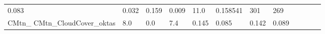 \documentclass[11pt]{article}
\begin{document}
\begin{longtable}[]{@{}llllllllllll@{}}
\begin{minipage}[t]{0.04\columnwidth}
0.083\strut
\end{minipage} & \begin{minipage}[t]{0.05\columnwidth}\raggedright\strut
0.032\strut
\end{minipage} & \begin{minipage}[t]{0.04\columnwidth}\raggedright\strut
0.159\strut
\end{minipage} & \begin{minipage}[t]{0.04\columnwidth}\raggedright\strut
0.009\strut
\end{minipage} & \begin{minipage}[t]{0.05\columnwidth}\raggedright\strut
11.0\strut
\end{minipage} & \begin{minipage}[t]{0.05\columnwidth}\raggedright\strut
0.158541\strut
\end{minipage} & \begin{minipage}[t]{0.05\columnwidth}\raggedright\strut
301\strut
\end{minipage} & \begin{minipage}[t]{0.07\columnwidth}\raggedright\strut
269\strut
\end{minipage}\tabularnewline
\begin{minipage}[t]{0.18\columnwidth}\raggedright\strut
CMtn\_ CMtn\_CloudCover\_oktas\strut
\end{minipage} & \begin{minipage}[t]{0.04\columnwidth}\raggedright\strut
8.0\strut
\end{minipage} & \begin{minipage}[t]{0.04\columnwidth}\raggedright\strut
0.0\strut
\end{minipage} & \begin{minipage}[t]{0.04\columnwidth}\raggedright\strut
7.4\strut
\end{minipage} & \begin{minipage}[t]{0.04\columnwidth}\raggedright\strut
0.145\strut
\end{minipage} & \begin{minipage}[t]{0.05\columnwidth}\raggedright\strut
0.085\strut
\end{minipage} & \begin{minipage}[t]{0.04\columnwidth}\raggedright\strut
0.142\strut
\end{minipage} & \begin{minipage}[t]{0.04\columnwidth}\raggedright\strut
0.089\strut
\end{minipage} & \begin{minipage}[t]{0.05\columnwidth}\raggedright\strut

\end{minipage}
\end{longtable}
\end{document}
